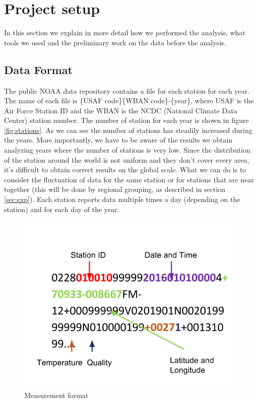 \documentclass{vldb}
\begin{document}
\FloatBarrier

\section{Project setup}
\label{sec:pro}
In this section we explain in more detail how we performed the analysis, what tools we used and the preliminary work on the data before the analysis.

\subsection{Data Format}
The public NOAA data repository contains a file for each station for each year. The name of each file is \{USAF code\}\-\{WBAN code\}-\{year\}, where USAF is the Air Force Station ID and the WBAN is the NCDC (National Climate Data Center) station number. The number of station for each year is shown in figure \ref{fig:stations}. As we can see the number of stations has steadily increased during the years. More importantly, we have to be aware of the results we obtain analyzing years where the number of stations is very low. Since the distribution of the station around the world is not uniform and they don't cover every area, it's difficult to obtain correct results on the global scale. What we can do is to consider the fluctuation of data for the same station or for stations that are near together (this will be done by regional grouping, as described in section \ref{sec:exp}). Each station reports data multiple times a day (depending on the station) and for each day of the year. \\

\begin{figure}[tbh]
\includegraphics[width=1\linewidth]{data}
\caption{Measurement format}
\label{fig:data}
\end{figure}
\end{document}
